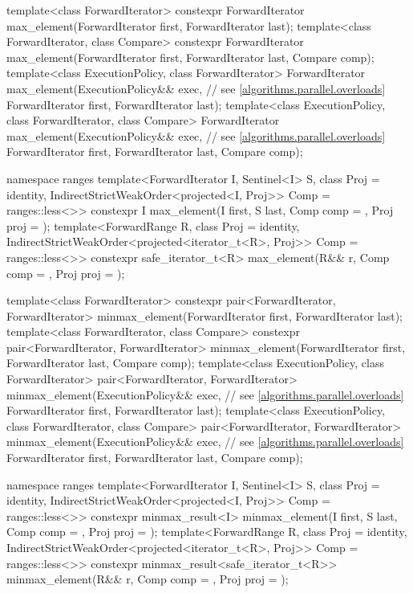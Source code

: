 \begin{codeblock}
{  template<class ForwardIterator>
    constexpr ForwardIterator max_element(ForwardIterator first, ForwardIterator last);
  template<class ForwardIterator, class Compare>
    constexpr ForwardIterator max_element(ForwardIterator first, ForwardIterator last,
                                          Compare comp);
  template<class ExecutionPolicy, class ForwardIterator>
    ForwardIterator max_element(ExecutionPolicy&& exec, // see \ref{algorithms.parallel.overloads}
                                ForwardIterator first, ForwardIterator last);
  template<class ExecutionPolicy, class ForwardIterator, class Compare>
    ForwardIterator max_element(ExecutionPolicy&& exec, // see \ref{algorithms.parallel.overloads}
                                ForwardIterator first, ForwardIterator last,
                                Compare comp);

 namespace ranges {
    template<ForwardIterator I, Sentinel<I> S, class Proj = identity,
             IndirectStrictWeakOrder<projected<I, Proj>> Comp = ranges::less<>>
      constexpr I max_element(I first, S last, Comp comp = {}, Proj proj = {});
    template<ForwardRange R, class Proj = identity,
             IndirectStrictWeakOrder<projected<iterator_t<R>, Proj>> Comp = ranges::less<>>
      constexpr safe_iterator_t<R>
        max_element(R&& r, Comp comp = {}, Proj proj = {});
  }

  template<class ForwardIterator>
    constexpr pair<ForwardIterator, ForwardIterator>
      minmax_element(ForwardIterator first, ForwardIterator last);
  template<class ForwardIterator, class Compare>
    constexpr pair<ForwardIterator, ForwardIterator>
      minmax_element(ForwardIterator first, ForwardIterator last, Compare comp);
  template<class ExecutionPolicy, class ForwardIterator>
    pair<ForwardIterator, ForwardIterator>
      minmax_element(ExecutionPolicy&& exec, // see \ref{algorithms.parallel.overloads}
                     ForwardIterator first, ForwardIterator last);
  template<class ExecutionPolicy, class ForwardIterator, class Compare>
    pair<ForwardIterator, ForwardIterator>
      minmax_element(ExecutionPolicy&& exec, // see \ref{algorithms.parallel.overloads}
                     ForwardIterator first, ForwardIterator last, Compare comp);

  namespace ranges {
    template<ForwardIterator I, Sentinel<I> S, class Proj = identity,
             IndirectStrictWeakOrder<projected<I, Proj>> Comp = ranges::less<>>
      constexpr minmax_result<I>
        minmax_element(I first, S last, Comp comp = {}, Proj proj = {});
    template<ForwardRange R, class Proj = identity,
             IndirectStrictWeakOrder<projected<iterator_t<R>, Proj>> Comp = ranges::less<>>
      constexpr minmax_result<safe_iterator_t<R>>
        minmax_element(R&& r, Comp comp = {}, Proj proj = {});
  }

}
\end{codeblock}
